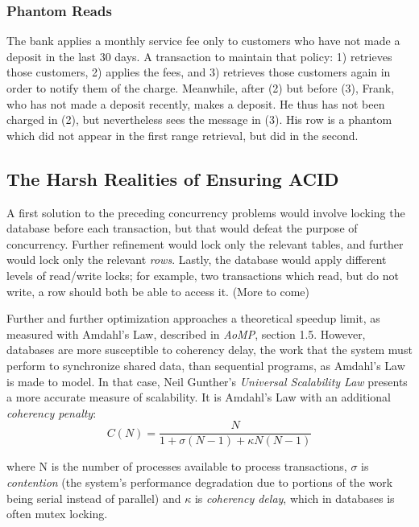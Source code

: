 \documentclass[12pt]{article} %
\begin{document}
\subsubsection{Phantom Reads}
The bank applies a monthly service fee only to customers who have not made a deposit in the last 30 days. A transaction to maintain that policy: 1) retrieves those customers, 2) applies the fees, and 3) retrieves those customers again in order to notify them of the charge. Meanwhile, after (2) but before (3), Frank, who has not made a deposit recently, makes a deposit. He thus has not been charged in (2), but nevertheless sees the message in (3). His row is a phantom which did not appear in the first range retrieval, but did in the second.

\subsection{The Harsh Realities of Ensuring ACID}
A first solution to the preceding concurrency problems would involve locking the database before each transaction, but that would defeat the purpose of concurrency. Further refinement would lock only the relevant tables, and further would lock only the relevant \textit{rows}. Lastly, the database would apply different levels of read/write locks; for example, two transactions which read, but do not write, a row should both be able to access it. (More to come)

Further and further optimization approaches a theoretical speedup limit, as measured with Amdahl's Law, described in \textit{AoMP}, section 1.5. However, databases are more susceptible to coherency delay, the work that the system must perform to synchronize shared data, than sequential programs, as Amdahl's Law is made to model. In that case, Neil Gunther's \textit{Universal Scalability Law} presents a more accurate measure of scalability. It is Amdahl's Law with an additional \textit{coherency penalty}: 
\[C(N) = \frac{N}{1+\sigma (N-1)+\kappa N(N-1)}\] 

where N is the number of processes available to process transactions, \(\sigma\) is \textit{contention} (the system's performance degradation due to portions of the work being serial instead of parallel) and \(\kappa\) is \textit{coherency delay}, which in databases is often mutex locking. 
\end{document}
